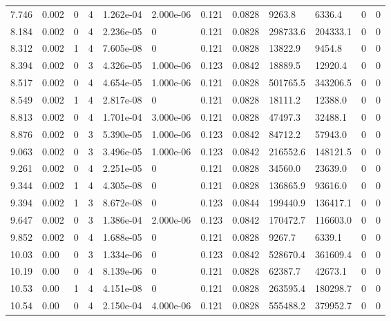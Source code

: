 \documentclass[preview]{standalone}
\begin{document}
{{{\begin{tabular}{L{1.2cm}C{1.2cm} C{0.3cm}C{0.5cm} C{1.4cm}C{1.4cm} C{1.4cm}C{1.4cm} C{1.6cm}C{1.6cm} C{1.6cm}C{1.6cm}}
  7.746  &  0.002  & 0     &  4 &  1.262e-04  & 2.000e-06  &  0.121&   0.0828& 9263.8 & 6336.4   &  0 & 0  \\ 
  8.184  &  0.002  & 0     &  4 &  2.236e-05  & 0  &  0.121&   0.0828& 298733.6 & 204333.1   &  0 & 0  \\ 
  8.312  &  0.002  & 1     &  4 &  7.605e-08  & 0  &  0.121&   0.0828& 13822.9 & 9454.8   &  0 & 0  \\ 
  8.394  &  0.002  & 0     &  3 &  4.326e-05  & 1.000e-06  &  0.123&   0.0842& 18889.5 & 12920.4   &  0 & 0  \\ 
  8.517  &  0.002  & 0     &  4 &  4.654e-05  & 1.000e-06  &  0.121&   0.0828& 501765.5 & 343206.5   &  0 & 0  \\ 
  8.549  &  0.002  & 1     &  4 &  2.817e-08  & 0  &  0.121&   0.0828& 18111.2 & 12388.0   &  0 & 0  \\ 
  8.813  &  0.002  & 0     &  4 &  1.701e-04  & 3.000e-06  &  0.121&   0.0828& 47497.3 & 32488.1   &  0 & 0  \\ 
  8.876  &  0.002  & 0     &  3 &  5.390e-05  & 1.000e-06  &  0.123&   0.0842& 84712.2 & 57943.0   &  0 & 0  \\ 
  9.063  &  0.002  & 0     &  3 &  3.496e-05  & 1.000e-06  &  0.123&   0.0842& 216552.6 & 148121.5   &  0 & 0  \\ 
  9.261  &  0.002  & 0     &  4 &  2.251e-05  & 0  &  0.121&   0.0828& 34560.0 & 23639.0   &  0 & 0  \\ 
  9.344  &  0.002  & 1     &  4 &  4.305e-08  & 0  &  0.121&   0.0828& 136865.9 & 93616.0   &  0 & 0  \\ 
  9.394  &  0.002  & 1     &  3 &  8.672e-08  & 0  &  0.123&   0.0844& 199440.9 & 136417.1   &  0 & 0  \\ 
  9.647  &  0.002  & 0     &  3 &  1.386e-04  & 2.000e-06  &  0.123&   0.0842& 170472.7 & 116603.0   &  0 & 0  \\ 
  9.852  &  0.002  & 0     &  4 &  1.688e-05  & 0  &  0.121&   0.0828& 9267.7 & 6339.1   &  0 & 0  \\ 
  10.03  &  0.00  & 0     &  3 &  1.334e-06  & 0  &  0.123&   0.0842& 528670.4 & 361609.4   &  0 & 0  \\ 
  10.19  &  0.00  & 0     &  4 &  8.139e-06  & 0  &  0.121&   0.0828& 62387.7 & 42673.1   &  0 & 0  \\ 
  10.53  &  0.00  & 1     &  4 &  4.151e-08  & 0  &  0.121&   0.0828& 263595.4 & 180298.7   &  0 & 0  \\ 
  10.54  &  0.00  & 0     &  4 &  2.150e-04  & 4.000e-06  &  0.121&   0.0828& 555488.2 & 379952.7   &  0 & 0  \\ 

\end{tabular}}}}
\end{document}
